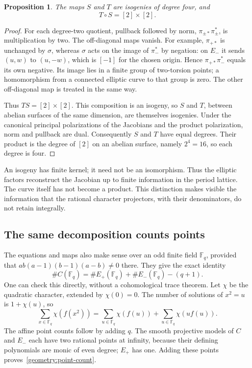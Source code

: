\documentclass[11pt]{article}
\newtheorem{proposition}{Proposition}[section]
\theoremstyle{remark}
\begin{document}
\begin{proposition}
The maps \(S\) and \(T\) are isogenies of degree four, and
\[
T\circ S=[2]\times[2].
\]
\end{proposition}
\begin{proof}
For each degree-two quotient, pullback followed by norm, \(\pi_{\pm*}\pi_\pm^*\), is multiplication by two. The off-diagonal maps vanish. For example, \(\pi_{+*}\) is unchanged by \(\sigma\), whereas \(\sigma\) acts on the image of \(\pi_-^*\) by negation: on \(E_-\) it sends \((u,w)\) to \((u,-w)\), which is \([-1]\) for the chosen origin. Hence \(\pi_{+*}\pi_-^*\) equals its own negative. Its image lies in a finite group of two-torsion points; a homomorphism from a connected elliptic curve to that group is zero. The other off-diagonal map is treated in the same way.

Thus \(TS=[2]\times[2]\). This composition is an isogeny, so \(S\) and \(T\), between abelian surfaces of the same dimension, are themselves isogenies. Under the canonical principal polarizations of the Jacobians and the product polarization, norm and pullback are dual. Consequently \(S\) and \(T\) have equal degrees. Their product is the degree of \([2]\) on an abelian surface, namely \(2^4=16\), so each degree is four.
\end{proof}

An isogeny has finite kernel; it need not be an isomorphism. Thus the elliptic factors reconstruct the Jacobian up to finite information in the period lattice. The curve itself has not become a product. This distinction makes visible the information that the rational character projectors, with their denominators, do not retain integrally.

\subsection{The same decomposition counts points}

The equations and maps also make sense over an odd finite field \(\mathbb F_q\), provided that \(ab(a-1)(b-1)(a-b)\ne0\) there. They give the exact identity
\begin{equation}
\boxed{\#C(\mathbb F_q)=\#E_+(\mathbb F_q)+\#E_-(\mathbb F_q)-(q+1).}
\label{geometry:point-count}
\end{equation}
One can check this directly, without a cohomological trace theorem. Let \(\chi\) be the quadratic character, extended by \(\chi(0)=0\). The number of solutions of \(x^2=u\) is \(1+\chi(u)\), so
\[
\sum_{x\in\mathbb F_q}\chi(f(x^2))
=\sum_{u\in\mathbb F_q}\chi(f(u))
+\sum_{u\in\mathbb F_q}\chi(u f(u)).
\]
The affine point counts follow by adding \(q\). The smooth projective models of \(C\) and \(E_-\) each have two rational points at infinity, because their defining polynomials are monic of even degree; \(E_+\) has one. Adding these points proves~\eqref{geometry:point-count}.
\end{document}
